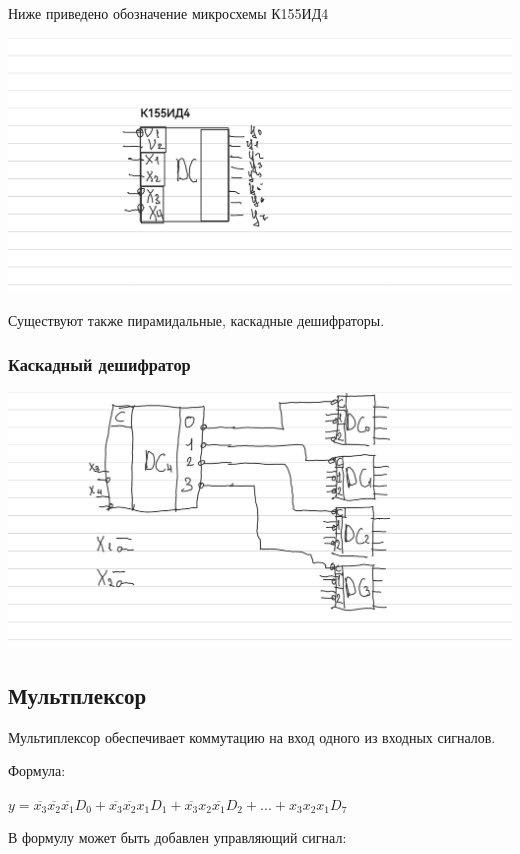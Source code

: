 \documentclass{article}
\begin{document}
\begin{flushleft}
Ниже приведено обозначение микросхемы К155ИД4

\hfill

\includegraphics[width=\textwidth]{assets/k155id4.png}

Существуют также пирамидальные, каскадные дешифраторы.

\subsubsection{Каскадный дешифратор}

\includegraphics[width=\textwidth]{assets/cascade.png}

\subsection{Мультплексор}

Мультиплексор обеспечивает коммутацию на вход одного из входных сигналов.

Формула:

$y = \overline{x_3}\overline{x_2}\overline{x_1}D_0 + \overline{x_3}\overline{x_2}x_1D_1 + \overline{x_3}x_2\overline{x_1}D_2 + ... + x_3x_2x_1D_7$

\hfill

В формулу может быть добавлен управляющий сигнал:


\end{flushleft}
\end{document}
